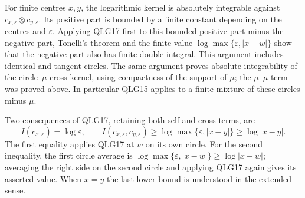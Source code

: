 \documentclass[11pt,a4paper]{article}
\begin{document}
For finite centres \(x,y\), the logarithmic kernel is absolutely
integrable against \(c_{x,\varepsilon}\otimes c_{y,\varepsilon}\).
Its positive part is bounded by a finite constant depending on the
centres and \(\varepsilon\). Applying QLG17 first to this bounded
positive part minus the negative part, Tonelli's theorem and the finite
value \(\log\max\{\varepsilon,|x-w|\}\) show that the negative
part also has finite double integral. This argument includes identical
and tangent circles. The same argument proves absolute integrability
of the circle--\(\mu\) cross kernel, using compactness of the support
of \(\mu\); the \(\mu\)--\(\mu\) term was proved above.
In particular QLG15 applies to a finite mixture of these circles minus
\(\mu\).

Two consequences of QLG17, retaining both self and cross terms, are
\[
 I(c_{x,\varepsilon})=\log\varepsilon,\qquad
 I(c_{x,\varepsilon},c_{y,\varepsilon})
 \geq\log\max\{\varepsilon,|x-y|\}\geq\log|x-y|.
 \tag{QLG18}
\]
The first equality applies QLG17 at \(w\) on its own circle.
For the second inequality, the first circle average is
\(\log\max\{\varepsilon,|x-w|\}\geq\log|x-w|\);
averaging the right side on the second circle and applying QLG17 again
gives its asserted value. When \(x=y\) the last lower bound is
understood in the extended sense.
\end{document}
